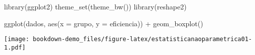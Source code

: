 \documentclass[
]{book}
\newenvironment{Shaded}{\begin{snugshade}}{\end{snugshade}}
\newcommand{\AttributeTok}[1]{\textcolor[rgb]{0.77,0.63,0.00}{#1}}
\newcommand{\FunctionTok}[1]{\textcolor[rgb]{0.00,0.00,0.00}{#1}}
\newcommand{\NormalTok}[1]{#1}
\newcommand{\SpecialCharTok}[1]{\textcolor[rgb]{0.00,0.00,0.00}{#1}}
\begin{document}
\begin{Shaded}
\begin{Highlighting}[]
\FunctionTok{library}\NormalTok{(ggplot2)}
\FunctionTok{theme\_set}\NormalTok{(}\FunctionTok{theme\_bw}\NormalTok{())}
\FunctionTok{library}\NormalTok{(reshape2)}

\FunctionTok{ggplot}\NormalTok{(dados, }\FunctionTok{aes}\NormalTok{(}\AttributeTok{x =}\NormalTok{ grupo, }\AttributeTok{y =}\NormalTok{ eficiencia)) }\SpecialCharTok{+}
  \FunctionTok{geom\_boxplot}\NormalTok{()}
\end{Highlighting}
\end{Shaded}

\texttt{[image: bookdown-demo\_files/figure-latex/estatisticanaoparametrica01-1.pdf]}

  
\end{document}
